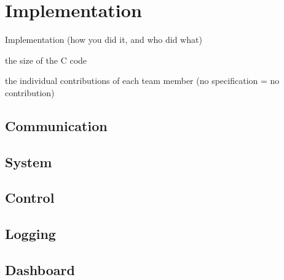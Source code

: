 \documentclass[final]{article}
\begin{document}
\section{Implementation}
\label{sec:implmentation}
Implementation (how you did it, and who did what)

the size of the C code

the individual contributions of each team member (no specification = no contribution)
\subsection{Communication}

\subsection{System}

\subsection{Control}

\subsection{Logging}

\subsection{Dashboard}
\end{document}
